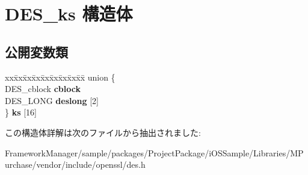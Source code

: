 \hypertarget{struct_d_e_s__ks}{}\section{D\+E\+S\+\_\+ks 構造体}
\label{struct_d_e_s__ks}
\subsection*{公開変数類}
\begin{DoxyCompactItemize}
\item 
\hypertarget{struct_d_e_s__ks_a5c379c09fa61b16d48dca78e4fea141d}{}\begin{tabbing}
xx\=xx\=xx\=xx\=xx\=xx\=xx\=xx\=xx\=\kill
union \{\\
\>DES\_cblock {\bfseries cblock}\\
\>DES\_LONG {\bfseries deslong} \mbox{[}2\mbox{]}\\
\} {\bfseries ks} \mbox{[}16\mbox{]}\label{struct_d_e_s__ks_a5c379c09fa61b16d48dca78e4fea141d}
\\

\end{tabbing}\end{DoxyCompactItemize}


この構造体詳解は次のファイルから抽出されました\+:\begin{DoxyCompactItemize}
\item 
Framework\+Manager/sample/packages/\+Project\+Package/i\+O\+S\+Sample/\+Libraries/\+M\+Purchase/vendor/include/openssl/des.\+h\end{DoxyCompactItemize}

